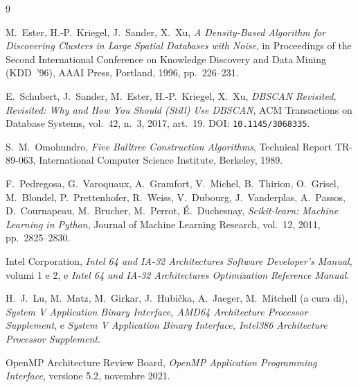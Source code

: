 \begin{thebibliography}{9}

M.~Ester, H.-P.~Kriegel, J.~Sander, X.~Xu,
\textit{A Density-Based Algorithm for Discovering Clusters in Large Spatial
Databases with Noise}, in Proceedings of the Second International Conference on
Knowledge Discovery and Data Mining (KDD~'96), AAAI Press, Portland, 1996,
pp.~226--231.

E.~Schubert, J.~Sander, M.~Ester, H.-P.~Kriegel, X.~Xu,
\textit{DBSCAN Revisited, Revisited: Why and How You Should (Still) Use DBSCAN},
ACM Transactions on Database Systems, vol.~42, n.~3, 2017, art.~19.
\newblock DOI: \texttt{10.1145/3068335}.

S.~M.~Omohundro,
\textit{Five Balltree Construction Algorithms}, Technical Report TR-89-063,
International Computer Science Institute, Berkeley, 1989.

F.~Pedregosa, G.~Varoquaux, A.~Gramfort, V.~Michel, B.~Thirion, O.~Grisel,
M.~Blondel, P.~Prettenhofer, R.~Weiss, V.~Dubourg, J.~Vanderplas, A.~Passos,
D.~Cournapeau, M.~Brucher, M.~Perrot, \'E.~Duchesnay,
\textit{Scikit-learn: Machine Learning in Python}, Journal of Machine Learning
Research, vol.~12, 2011, pp.~2825--2830.

Intel Corporation,
\textit{Intel 64 and IA-32 Architectures Software Developer's Manual}, volumi
1 e 2, e \textit{Intel 64 and IA-32 Architectures Optimization Reference
Manual}.

H.~J.~Lu, M.~Matz, M.~Girkar, J.~Hubi\v{c}ka, A.~Jaeger, M.~Mitchell (a cura di),
\textit{System V Application Binary Interface, AMD64 Architecture Processor
Supplement}, e \textit{System V Application Binary Interface, Intel386
Architecture Processor Supplement}.

OpenMP Architecture Review Board,
\textit{OpenMP Application Programming Interface}, versione 5.2, novembre 2021.

\end{thebibliography}
